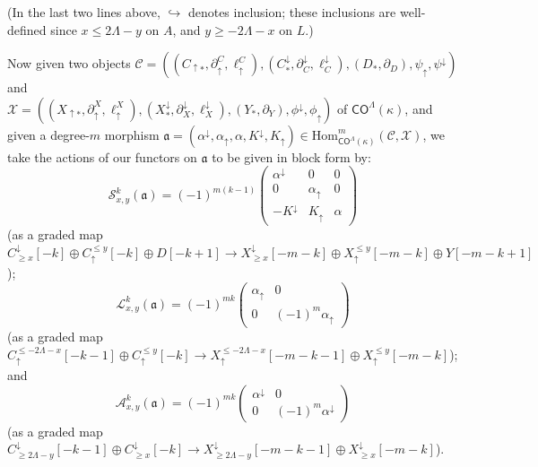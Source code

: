 \documentclass[11pt]{amsart}
\theoremstyle{definition}
\theoremstyle{remark}
\numberwithin{equation}{section}
\begin{document}
(In the last two lines above, $\hookrightarrow$ denotes inclusion; these inclusions are well-defined since $x\leq 2\Lambda-y$ on $A$, and $y\geq -2\Lambda-x$ on $L$.)

Now given two objects $\mathcal{C}=\left((C_{\uparrow *},\partial_{\uparrow}^C,\ell_{\uparrow}^C),(C^{\downarrow}_{*},\partial^{\downarrow}_C,\ell^{\downarrow}_C),(D_*,\partial_D),\psi_{\uparrow},\psi^{\downarrow}\right)$    and\\ $\mathcal{X}=\left((X_{\uparrow *},\partial_{\uparrow}^X,\ell_{\uparrow}^{X}),(X^{\downarrow}_{*},\partial^{\downarrow}_{X},\ell^{\downarrow}_{X}),(Y_*,\partial_Y),\phi^{\downarrow},\phi_{\uparrow}\right)$ of $\mathsf{CO}^{\Lambda}(\kappa)$, and given a degree-$m$ morphism $\mathfrak{a}=(\alpha^{\downarrow},\alpha_{\uparrow},\alpha,K^{\downarrow},K_{\uparrow})\in \mathrm{Hom}_{\mathsf{CO}^{\Lambda}(\kappa)}^m(\mathcal{C},\mathcal{X})$, we take the actions of our functors on $\mathfrak{a}$ to be given in block form by: \begin{equation}\label{sfun} \mathcal{S}^{k}_{x,y}(\mathfrak{a})=(-1)^{m(k-1)}\left(\begin{array}{ccc} \alpha^{\downarrow} & 0 & 0 \\ 0 & \alpha_{\uparrow} & 0 \\ -K^{\downarrow} & K_{\uparrow} & \alpha  \end{array} \right)\end{equation}
(as a graded map $C^{\downarrow}_{\geq x}[-k]\oplus C_{\uparrow}^{\leq y}[-k]\oplus D[-k+1]\to X^{\downarrow}_{\geq x}[-m-k]\oplus X_{\uparrow}^{\leq y}[-m-k]\oplus Y[-m-k+1]$); 
\begin{equation}\label{lfun} \mathcal{L}^{k}_{x,y}(\mathfrak{a})= (-1)^{mk}\left(\begin{array}{cc} \alpha_{\uparrow} & 0 \\ 0 & (-1)^{m}\alpha_{\uparrow} \end{array} \right)  \end{equation} (as a graded map $C_{\uparrow}^{\leq -2\Lambda-x}[-k-1]\oplus C_{\uparrow}^{\leq y}[-k]\to X_{\uparrow}^{\leq -2\Lambda-x}[-m-k-1]\oplus X_{\uparrow}^{\leq y}[-m-k]$);
and \begin{equation} \label{afun} \mathcal{A}^{k}_{x,y}(\mathfrak{a})= (-1)^{mk}\left(\begin{array}{cc} \alpha^{\downarrow} & 0 \\ 0 & (-1)^{m}\alpha^{\downarrow} \end{array} \right)  \end{equation} (as a graded map $C^{\downarrow}_{\geq 2\Lambda-y}[-k-1]\oplus C^{\downarrow}_{\geq x}[-k]\to X^{\downarrow}_{\geq 2\Lambda-y}[-m-k-1]\oplus X^{\downarrow}_{\geq x}[-m-k]$).
\end{document}
